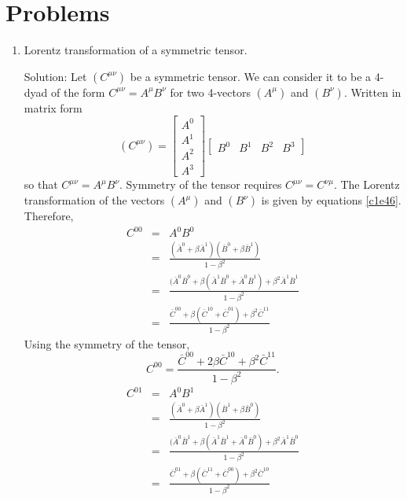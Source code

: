 \section{Problems}
\begin{enumerate}
\item Lorentz transformation of a symmetric tensor. 
\item[Solution:] Let $(C^{\mu\nu})$ be a symmetric tensor. We can consider it to
be a 4-dyad of the form $C^{\mu\nu} = A^\mu B^\nu$ for two 4-vectors $(A^\mu)$ 
and $(B^\nu)$. Written in matrix form
\begin{equation}\label{c1e87}
(C^{\mu\nu}) = \begin{bmatrix}A^0 \\ A^1 \\ A^2 \\ A^3\end{bmatrix}
\begin{bmatrix}B^0 & B^1 & B^2 & B^3 \end{bmatrix}
\end{equation}
so that $C^{\mu\nu} = A^\mu B^\nu$. Symmetry of the tensor requires $C^{\mu\nu}
= C^{\nu\mu}$. The Lorentz transformation of the vectors $(A^\mu)$ and $(B^\nu)$
is given by equations \eqref{c1e46}. Therefore,
\begin{eqnarray*}
C^{00} &=& A^0 B^0 \\
 &=& \frac{(\bar{A}^0 + \beta\bar{A}^1)(\bar{B}^0 + \beta\bar{B}^1)}{1 - \beta^2} \\
 &=& \frac{(\bar{A}^0\bar{B}^0 + \beta(\bar{A}^1\bar{B}^0 + \bar{A}^0\bar{B}^1) + \beta^2\bar{A}^1\bar{B}^1}{1 - \beta^2} \\
 &=& \frac{\bar{C}^{00} + \beta(\bar{C}^{10} + \bar{C}^{01}) + \beta^2\bar{C}^{11}}{1 - \beta^2}
\end{eqnarray*}
Using the symmetry of the tensor,
\begin{equation}\label{c1e88}
C^{00} = \frac{\bar{C}^{00} + 2\beta\bar{C}^{10} + \beta^2\bar{C}^{11}}{1 - \beta^2}.
\end{equation}
\begin{eqnarray*}
C^{01} &=& A^0 B^1 \\
 &=& \frac{(\bar{A}^0 + \beta\bar{A}^1)(\bar{B}^1 + \beta\bar{B}^0)}{1 - \beta^2} \\
 &=& \frac{(\bar{A}^0\bar{B}^1 + \beta(\bar{A}^1\bar{B}^1 + \bar{A}^0\bar{B}^0) + \beta^2\bar{A}^1\bar{B}^0}{1 - \beta^2} \\
 &=& \frac{\bar{C}^{01} + \beta(\bar{C}^{11} + \bar{C}^{00}) + \beta^2\bar{C}^{10}}{1 - \beta^2}

\end{eqnarray*}
\end{enumerate}
